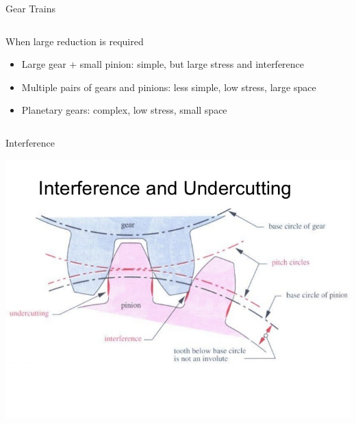 \documentclass[10pt, svgnames]{beamer}
\begin{document}
\begin{frame}[label={sec:org873c7d3}]{Gear Trains}
\begin{columns}
\begin{column}{0.5\columnwidth}
When large reduction is required

\begin{itemize}
\item Large gear + small pinion: simple, but large stress and interference

\item Multiple pairs of gears and pinions: less simple, low stress, large
space

\item Planetary gears: complex, low stress, small space
\end{itemize}
\end{column}
\end{columns}
\end{frame}

\begin{frame}[label={sec:org5895274}]{Interference}
\begin{center}
\includegraphics[width=.9\linewidth]{pictures/interference.jpg}
\end{center}
\end{frame}
\end{document}

